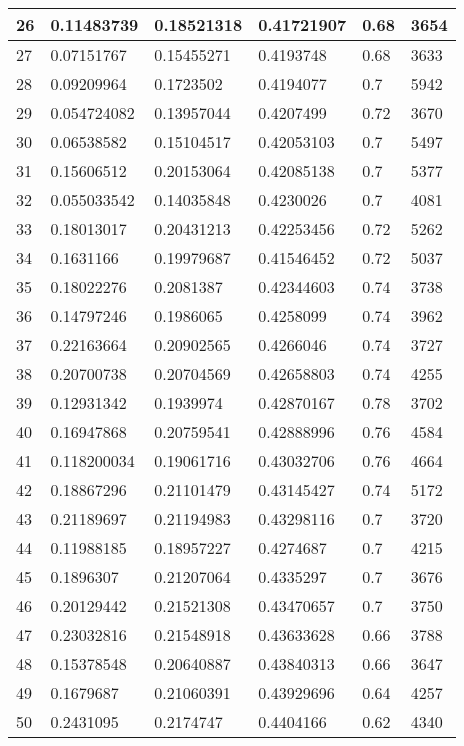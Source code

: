 \begin{longtable}{|l|l|l|l|l|l|}
26 & 0.11483739 & 0.18521318 & 0.41721907 & 0.68 & 3654 \\ \hline 
27 & 0.07151767 & 0.15455271 & 0.4193748 & 0.68 & 3633 \\ \hline 
28 & 0.09209964 & 0.1723502 & 0.4194077 & 0.7 & 5942 \\ \hline 
29 & 0.054724082 & 0.13957044 & 0.4207499 & 0.72 & 3670 \\ \hline 
30 & 0.06538582 & 0.15104517 & 0.42053103 & 0.7 & 5497 \\ \hline 
31 & 0.15606512 & 0.20153064 & 0.42085138 & 0.7 & 5377 \\ \hline 
32 & 0.055033542 & 0.14035848 & 0.4230026 & 0.7 & 4081 \\ \hline 
33 & 0.18013017 & 0.20431213 & 0.42253456 & 0.72 & 5262 \\ \hline 
34 & 0.1631166 & 0.19979687 & 0.41546452 & 0.72 & 5037 \\ \hline 
35 & 0.18022276 & 0.2081387 & 0.42344603 & 0.74 & 3738 \\ \hline 
36 & 0.14797246 & 0.1986065 & 0.4258099 & 0.74 & 3962 \\ \hline 
37 & 0.22163664 & 0.20902565 & 0.4266046 & 0.74 & 3727 \\ \hline 
38 & 0.20700738 & 0.20704569 & 0.42658803 & 0.74 & 4255 \\ \hline 
39 & 0.12931342 & 0.1939974 & 0.42870167 & 0.78 & 3702 \\ \hline 
40 & 0.16947868 & 0.20759541 & 0.42888996 & 0.76 & 4584 \\ \hline 
41 & 0.118200034 & 0.19061716 & 0.43032706 & 0.76 & 4664 \\ \hline 
42 & 0.18867296 & 0.21101479 & 0.43145427 & 0.74 & 5172 \\ \hline 
43 & 0.21189697 & 0.21194983 & 0.43298116 & 0.7 & 3720 \\ \hline 
44 & 0.11988185 & 0.18957227 & 0.4274687 & 0.7 & 4215 \\ \hline 
45 & 0.1896307 & 0.21207064 & 0.4335297 & 0.7 & 3676 \\ \hline 
46 & 0.20129442 & 0.21521308 & 0.43470657 & 0.7 & 3750 \\ \hline 
47 & 0.23032816 & 0.21548918 & 0.43633628 & 0.66 & 3788 \\ \hline 
48 & 0.15378548 & 0.20640887 & 0.43840313 & 0.66 & 3647 \\ \hline 
49 & 0.1679687 & 0.21060391 & 0.43929696 & 0.64 & 4257 \\ \hline 
50 & 0.2431095 & 0.2174747 & 0.4404166 & 0.62 & 4340 \\ \hline 
\end{longtable}